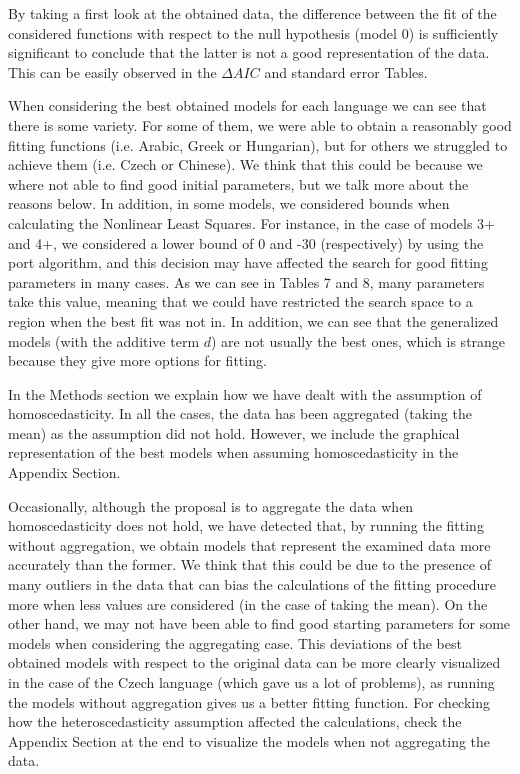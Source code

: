 \documentclass{article}
\begin{document}
By taking a first look at the obtained data, the difference between the fit of the considered functions with respect to the null hypothesis (model 0) is sufficiently significant to conclude that the latter is not a good representation of the data. This can be easily observed in the $\Delta AIC$ and standard error Tables.

When considering the best obtained models for each language we can see that there is some variety. For some of them, we were able to obtain a reasonably good fitting functions (i.e. Arabic, Greek or Hungarian), but for others we struggled to achieve them (i.e. Czech or Chinese). We think that this could be because we where not able to find good initial parameters, but we talk more about the reasons below. In addition, in some models, we considered bounds when calculating the Nonlinear Least Squares. For instance, in the case of models 3+ and 4+, we considered a lower bound of 0 and -30 (respectively) by using the port algorithm, and this decision may have affected the search for good fitting parameters in many cases. As we can see in Tables 7 and 8, many parameters take this value, meaning that we could have restricted the search space to a region when the best fit was not in. In addition, we can see that the generalized models (with the additive term $d$) are not usually the best ones, which is strange because they give more options for fitting.

In the Methods section we explain how we have dealt with the assumption of homoscedasticity. In all the cases, the data has been aggregated (taking the mean) as the assumption did not hold. However, we include the graphical representation of the best models when assuming homoscedasticity in the Appendix Section.

Occasionally, although the proposal is to aggregate the data when homoscedasticity does not hold, we have detected that, by running the fitting without aggregation, we obtain models that represent the examined data more accurately than the former. We think that this could be due to the presence of many outliers in the data that can bias the calculations of the fitting procedure more when less values are considered (in the case of taking the mean). On the other hand, we may not have been able to find good starting parameters for some models when considering the aggregating case. This deviations of the best obtained models with respect to the original data can be more clearly visualized in the case of the Czech language (which gave us a lot of problems), as running the models without aggregation gives us a better fitting function. For checking how the heteroscedasticity assumption affected the calculations, check the Appendix Section at the end to visualize the models when not aggregating the data.
\end{document}
